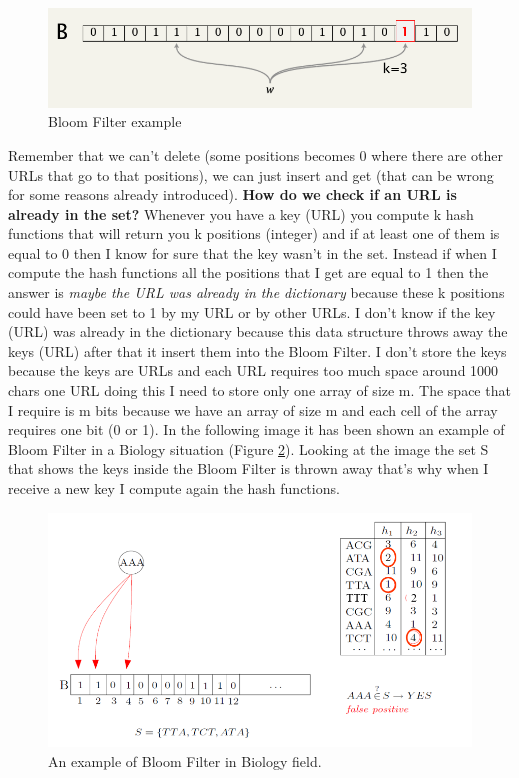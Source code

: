 \begin{figure} [h!]
    \centering
    \includegraphics[width=0.75\linewidth]{images/bloomfilterexample.png}
    \caption{Bloom Filter example}
    \label{fig:bloomfilterexample}
\end{figure}
Remember that we can't delete (some positions becomes 0 where there are other URLs that go to that positions), we can just insert and get (that can be wrong for some reasons already introduced).\newline
\textbf{How do we check if an URL is already in the set?} Whenever you have a key (URL) you compute k hash functions that will return you k positions (integer) and if at least one of them is equal to 0 then I know for sure that the key wasn't in the set. Instead if when I compute the hash functions all the positions that I get are equal to 1 then the answer is \textit{maybe the URL was already in the dictionary} because these k positions could have been set to 1 by my URL or by other URLs.\newline
I don't know if the key (URL) was already in the dictionary because this data structure throws away the keys (URL) after that it insert them into the Bloom Filter. I don't store the keys because the keys are URLs and each URL requires too much space around 1000 chars one URL doing this I need to store only one array of size m. The space that I require is m bits because we have an array of size m and each cell of the array requires one bit (0 or 1). \newline
In the following image it has been shown an example of Bloom Filter in a Biology situation (Figure \ref{fig:biology}). Looking at the image the set S that shows the keys inside the Bloom Filter is thrown away that's why when I receive a new key I compute again the hash functions.
\begin{figure} 
    \centering
    \includegraphics[width=0.75\linewidth]{images/bloomfilterbiologic.png}
    \caption{An example of Bloom Filter in Biology field.}
    \label{fig:biology}
\end{figure}\newline
